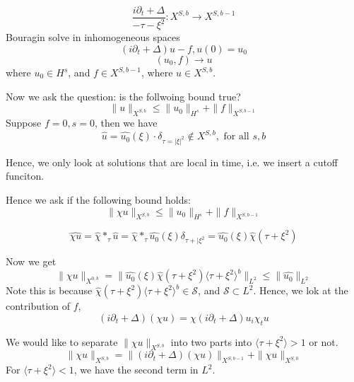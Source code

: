 \begin{equation*}
    \frac{i\partial_t+\Delta}{-\tau-\xi^2}: X^{S,b}\to X^{S,b-1}
\end{equation*}
Bouragin  solve in inhomogeneous spaces
\begin{equation*}
    (i\partial_t+\Delta)u-f, u(0)=u_0
\end{equation*}
\begin{equation*}
    (u_0, f)\to u
\end{equation*}
where $u_0\in H^s$, and $f\in X^{S,b-1}$, where $u\in X^{S,b}$.

Now we ask the question: is the follwoing bound true?
\begin{equation*}
    \|u\|_{X^{S,b}}\leq \|u_0\|_{H^s}+\|f\|_{X^{S,b-1}}
\end{equation*}
Suppose $f=0, s=0$, then we have
\begin{equation*}
    \widehat{u}=\widehat{u_0}(\xi)\cdot\delta_{\tau=|\xi|^2}\not\in X^{S,b}, \text{ for all } s, b
\end{equation*}

Hence, we only look at solutions that are local in time, i.e. we insert a cutoff funciton.

Hence we ask if the following bound holds:
\begin{equation*}
    \|\chi u\|_{X^{S,b}}\leq \|u_0\|_{H^s}+\|f\|_{X^{S,b-1}}
\end{equation*}

\begin{equation*}
    \widehat{\chi u}=\widehat{\chi}\ast_\tau\widehat{u}=\widehat{\chi}\ast_\tau\widehat{u_0}(\xi)\delta_{\tau+|\xi^2}=\widehat{u_0}(\xi)\widehat{\chi}(\tau+\xi^2)
\end{equation*}

Now we get
\begin{equation*}
    \|\chi u\|_{X^{0,b}}=\|\widehat{u_0}(\xi)\widehat{\chi}(\tau+\xi^2)\langle \tau+\xi^2\rangle^b\|_{L^2}\leq \|\widehat{u_0}\|_{L^2}
\end{equation*}
Note this is because $\widehat{\chi}(\tau+\xi^2)\langle \tau+\xi^2\rangle^b\in\mathcal{S}$, and $\mathcal{S}\subset L^2$. Hence, we lok at the contribution of $f$,
\begin{equation*}
    (i\partial_t+\Delta)(\chi u)=\chi(i\partial_t+\Delta)u_i\chi_t u
\end{equation*}

We would like to separate $\|\chi u\|_{X^{S,b}}$ into two parts into $\langle \tau+\xi^2\rangle>1$ or not.
\begin{equation*}
    \|\chi u\|_{X^{S,b}}=\|(i\partial_t+\Delta)(\chi u)\|_{X^{S,b-1}}+\|\chi u\|_{X^{S,0}}
\end{equation*}
For $\langle \tau+\xi^2\rangle<1$, we have the second term in $L^2$.

